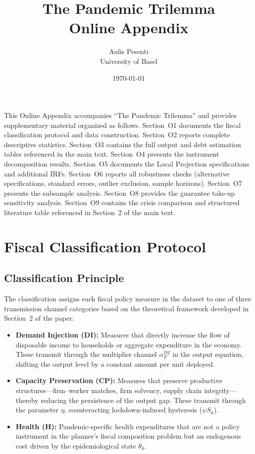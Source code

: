 \documentclass[12pt, a4paper]{article}
\title{\textbf{The Pandemic Trilemma} \\[0.5em]
\Large Online Appendix}
\author{Aulis Pesenti \\ University of Basel}
\date{\today}
\begin{document}
\maketitle

\setcounter{section}{0}
\renewcommand{\thesection}{O\arabic{section}}
\renewcommand{\thetable}{O\arabic{table}}
\renewcommand{\thefigure}{O\arabic{figure}}
\renewcommand{\theequation}{O.\arabic{equation}}

\noindent This Online Appendix accompanies ``The Pandemic Trilemma'' and provides supplementary material organized as follows. Section~O1 documents the fiscal classification protocol and data construction. Section~O2 reports complete descriptive statistics. Section~O3 contains the full output and debt estimation tables referenced in the main text. Section~O4 presents the instrument decomposition results. Section~O5 documents the Local Projection specifications and additional IRFs. Section~O6 reports all robustness checks (alternative specifications, standard errors, outlier exclusion, sample horizons). Section~O7 presents the subsample analysis. Section~O8 provides the guarantee take-up sensitivity analysis. Section~O9 contains the crisis comparison and structured literature table referenced in Section~2 of the main text.


\section{Fiscal Classification Protocol}
\label{app:classification}

\subsection{Classification Principle}

The classification assigns each fiscal policy measure in the dataset to one of three transmission channel categories based on the theoretical framework developed in Section~2 of the paper:

\begin{itemize}
  \item \textbf{Demand Injection (DI):} Measures that directly increase the flow of disposable income to households or aggregate expenditure in the economy. These transmit through the multiplier channel $\alpha_F^{DI}$ in the output equation, shifting the output level by a constant amount per unit deployed.
  \item \textbf{Capacity Preservation (CP):} Measures that preserve productive structures---firm--worker matches, firm solvency, supply chain integrity---thereby reducing the persistence of the output gap. These transmit through the parameter $\eta$, counteracting lockdown-induced hysteresis ($\psi S_k$).
  \item \textbf{Health (H):} Pandemic-specific health expenditures that are not a policy instrument in the planner's fiscal composition problem but an endogenous cost driven by the epidemiological state $\theta_k$.
\end{itemize}
\end{document}

